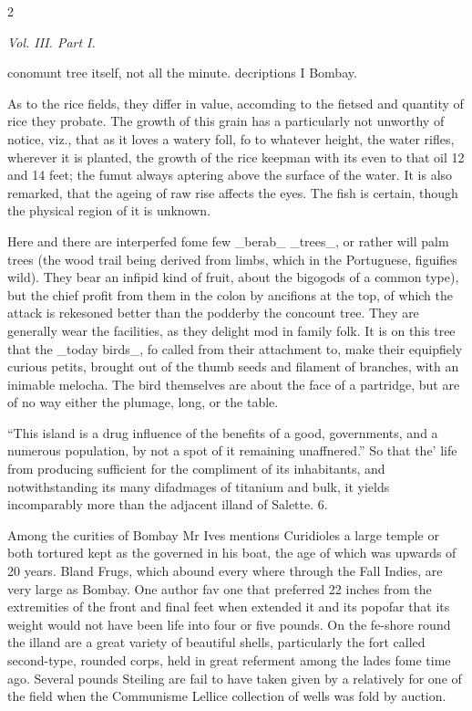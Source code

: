 \documentclass[10pt]{article}
\begin{document}
\begin{multicols}{2}
\begin{center}\small\itshape Vol. III. Part I.\end{center}
conomunt tree itself, not all the minute. decriptions I Bombay.

As to the rice fields, they differ in value, accomding to the fietsed and quantity of rice they probate. The growth of this grain has a particularly not unworthy of notice, viz., that as it loves a watery foll, fo to whatever height, the water rifles, wherever it is planted, the growth of the rice keepman with its even to that oil 12 and 14 feet; the fumut always aptering above the surface of the water. It is also remarked, that the ageing of raw rise affects the eyes. The fish is certain, though the physical region of it is unknown.

Here and there are interperfed fome few \_berab\_ \_trees\_, or rather will palm trees (the wood trail being derived from limbs, which in the Portuguese, figuifies wild). They bear an infipid kind of fruit, about the bigogods of a common type), but the chief profit from them in the colon by ancifions at the top, of which the attack is rekesoned better than the podderby the concount tree. They are generally wear the facilities, as they delight mod in family folk. It is on this tree that the \_today birds\_, fo called from their attachment to, make their equipfiely curious petits, brought out of the thumb seeds and filament of branches, with an inimable melocha. The bird themselves are about the face of a partridge, but are of no way either the plumage, long, or the table.

“This island is a drug influence of the benefits of a good, governments, and a numerous population, by not a spot of it remaining unaffnered.” So that the’ life from producing sufficient for the compliment of its inhabitants, and notwithstanding its many difadmages of titanium and bulk, it yields incomparably more than the adjacent illand of Salette. 6.

Among the curities of Bombay Mr Ives mentions Curidioles a large temple or both tortured kept as the governed in his boat, the age of which was upwards of 20 years. Bland Frugs, which abound every where through the Fall Indies, are very large as Bombay. One author fav one that preferred 22 inches from the extremities of the front and final feet when extended it and its popofar that its weight would not have been life into four or five pounds. On the fe-shore round the illand are a great variety of beautiful shells, particularly the fort called second-type, rounded corps, held in great referment among the lades fome time ago. Several pounds Steiling are fail to have taken given by a relatively for one of the field when the Communisme Lellice collection of wells was fold by auction.


\end{multicols}
\end{document}
